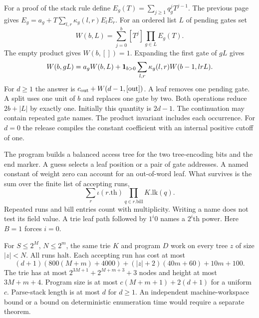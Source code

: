 \clearpage
{}
For a proof of the stack rule define $E_g(T)=\sum_{j\ge1}q_g^jT^{j-1}$. The previous page gives $E_g=a_g+T\sum_{l,r}\kappa_g(l,r)E_lE_r$. For an ordered list $L$ of pending gates set
\[
 W(b,L)=\sum_{j=0}^b[T^j]\prod_{g\in L}E_g(T).
\]
The empty product gives $W(b,[])=1$. Expanding the first gate of $gL$ gives
\[
 W(b,gL)=a_gW(b,L)+{\bf1}_{b>0}
   \sum_{l,r}\kappa_g(l,r)W(b-1,lrL).
\]
For $d\ge1$ the answer is $c_{\rm out}+W(d-1,[{\rm out}])$. A leaf removes one pending gate. A split uses one unit of $b$ and replaces one gate by two. Both operations reduce $2b+|L|$ by exactly one. Initially this quantity is $2d-1$. The continuation may contain repeated gate names. The product invariant includes each occurrence. For $d=0$ the release compiles the constant coefficient with an internal positive cutoff of one.

The program builds a balanced access tree for the two tree-encoding bits and the end marker. A guess selects a leaf position or a pair of gate addresses. A named constant of weight zero can account for an out-of-word leaf. What survives is the sum over the finite list of accepting runs,
\[
 \sum_r\iota(r.\mathrm{th})\prod_{q\in r.\mathrm{bill}}K.\mathrm{lk}(q).
\]
Repeated runs and bill entries count with multiplicity. Writing a name does not test its field value. A trie leaf path followed by $1^i0$ names a $2^i$th power. Here $B=1$ forces $i=0$.

For $S\le2^M$, $N\le2^m$, the same trie $K$ and program $D$ work on every tree $z$ of size $|z|<N$. All runs halt. Each accepting run has cost at most
\[
(d+1)(800(M+m)+4000)+(|z|+2)(40m+60)+10m+100 .
\]
The trie has at most $2^{3M+1}+2^{M+m+3}+3$ nodes and height at most $3M+m+4$. Program size is at most $c(M+m+1)+2(d+1)$ for a uniform $c$. Parse-stack length is at most $d$ for $d\ge1$. An independent machine-workspace bound or a bound on deterministic enumeration time would require a separate theorem.

\clearpage
{}

